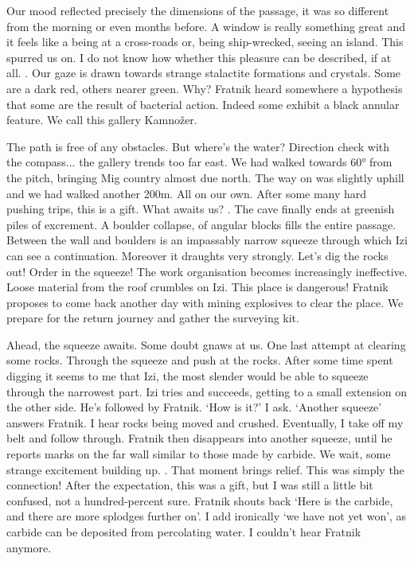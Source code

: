 Our mood reflected precisely the dimensions of the passage, it was so different from the morning or even months before. A window is really something great and it feels like a being at a cross-roads or, being ship-wrecked, seeing an island. This spurred us on. I do not know how whether this pleasure can be described, if at all. . Our gaze is drawn towards strange stalactite formations and crystals. Some are a dark red, others nearer green. Why? Fratnik heard somewhere a hypothesis that some are the result of bacterial action. Indeed some exhibit a black annular feature. We call this gallery Kamnožer. 

The path is free of any obstacles. But where's the water? Direction check with the compass... the gallery trends too far east. We had walked towards 60° from the pitch, bringing Mig country almost due north. The way on was slightly uphill and we had walked another 200m. All on our own. After some many hard pushing trips, this is a gift. What awaits us? . The cave finally ends at greenish piles of excrement. A boulder collapse, of angular blocks fills the entire passage. Between the wall and boulders is an impassably narrow squeeze through which Izi can see a continuation. Moreover it draughts very strongly. Let's dig the rocks out! Order in the squeeze! The work organisation becomes increasingly ineffective. Loose material from the roof crumbles on Izi. This place is dangerous! Fratnik proposes to come back another day with mining explosives to clear the place. We prepare for the return journey and gather the surveying kit. 

Ahead, the squeeze awaits. Some doubt gnaws at us. One last attempt at clearing some rocks. Through the squeeze and push at the rocks. After some time spent digging it seems to me that Izi, the most slender would be able to squeeze through the narrowest part. Izi tries and succeeds, getting to a small extension on the other side. He's followed by Fratnik. `How is it?' I ask. `Another squeeze' answers Fratnik. I hear rocks being moved and crushed. Eventually, I take off my belt and follow through. Fratnik then disappears into another squeeze, until he reports marks on the far wall similar to those made by carbide. We wait, some strange excitement building up. . That moment brings relief. This was simply the connection! After the expectation, this was a gift, but I was still a little bit confused, not a hundred-percent sure. Fratnik shouts back `Here is the carbide, and there are more splodges further on'. I add ironically `we have not yet won', as carbide can be deposited from percolating water. I couldn't hear Fratnik anymore.

